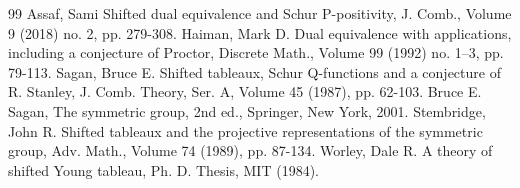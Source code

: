 \begin{thebibliography}{99}
 Assaf, Sami Shifted dual equivalence and Schur P-positivity, J. Comb., Volume 9 (2018) no. 2, pp. 279-308.
 Haiman, Mark D. Dual equivalence with applications, including a conjecture of Proctor, Discrete Math., Volume 99 (1992) no. 1–3, pp. 79-113.
 Sagan, Bruce E. Shifted tableaux, Schur Q-functions and a conjecture of R. Stanley, J. Comb. Theory, Ser. A, Volume 45 (1987), pp. 62-103.
 Bruce E. Sagan, The symmetric group, 2nd ed., Springer, New York, 2001.
 Stembridge, John R. Shifted tableaux and the projective representations of the symmetric group, Adv. Math., Volume 74 (1989), pp. 87-134.
 Worley, Dale R. A theory of shifted Young tableau, Ph. D. Thesis, MIT (1984).
\end{thebibliography}
